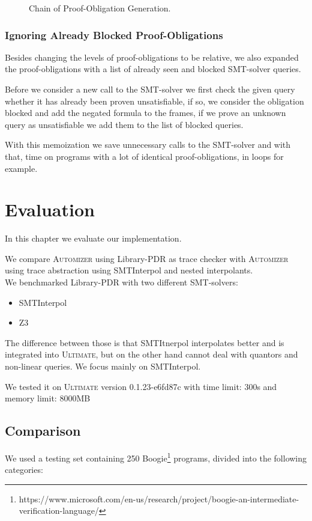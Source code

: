\documentclass[11pt, a4paper, BCOR=10mm, ngerman]{scrbook}
\begin{document}
\begin{figure}[H]
\centering
\resizebox{\textwidth}{!}{}
\caption{Chain of Proof-Obligation Generation.}
\label{fig:the_nice_figure}
\end{figure}
 

\subsection{Ignoring Already Blocked Proof-Obligations}
Besides changing the levels of proof-obligations to be relative, we also expanded the proof-obligations with a list of already seen and blocked SMT-solver queries. \par Before we consider a new call to the SMT-solver we first check the given query whether it has already been proven unsatisfiable, if so, we consider the obligation blocked and add the negated formula to the frames, if we prove an unknown query as unsatisfiable we add them to the list of blocked queries. \par
With this memoization we save unnecessary calls to the SMT-solver and with that, time on programs with a lot of identical proof-obligations, in loops for example.


\chapter{Evaluation}
In this chapter we evaluate our implementation. \par
We compare \textsc{Automizer} using Library-PDR as trace checker with  \textsc{Automizer} using trace abstraction using SMTInterpol and nested interpolants. \\
We benchmarked Library-PDR with two different SMT-solvers:
\begin{itemize}
\item SMTInterpol \cite{Zitat03}
\item Z3 \cite{Zitat04}
\end{itemize}
The difference between those is that SMTItnerpol interpolates better and is integrated into \textsc{Ultimate}, but on the other hand cannot deal with quantors and non-linear queries. We focus mainly on SMTInterpol. \par

We tested it on \textsc{Ultimate} version 0.1.23-e6fd87c with time limit: 300s and memory limit: 8000MB


\section{Comparison}
We used a testing set containing 250 Boogie\footnote{https://www.microsoft.com/en-us/research/project/boogie-an-intermediate-verification-language/} programs, divided into the following categories: \\
\end{document}

